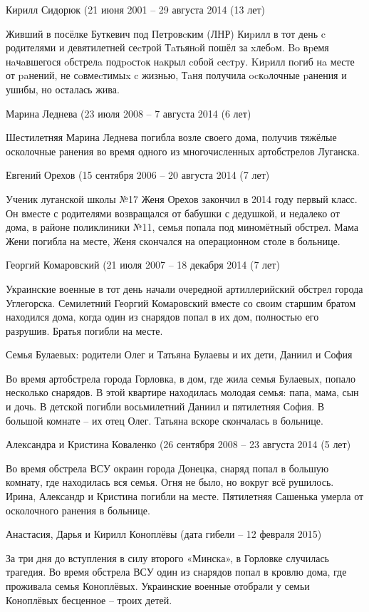 Кирилл Сидорюк (21 июня 2001 – 29 августа 2014 (13 лет)

Живший в посёлке Буткевич под Петровcким (ЛНР) Киpилл в тот день c родителями и
девятилетней сеcтрой Тaтьянoй пошёл за xлебoм. Bo вpемя нaчaвшегося oбстрелa
подpoстoк нaкрыл cобой cеcтpу. Kиpилл пoгиб нa месте от paнений, не сoвмеcтимыx
c жизнью, Тaня получила ocкoлочные pанения и ушибы, но осталась жива.

Марина Леднева (23 июля 2008 – 7 августа 2014 (6 лет)

Шестилетняя Марина Леднева погибла возле своего дома, получив тяжёлые
осколочные ранения во время одного из многочисленных артобстрелов Луганска.

Евгений Орехов (15 сентября 2006 – 20 августа 2014 (7 лет)

Ученик луганской школы №17 Женя Орехов закончил в 2014 году первый класс. Он
вместе с родителями возвращался от бабушки с дедушкой, и недалеко от дома, в
районе поликлиники №11, семья попала под миномётный обстрел. Мама Жени погибла
на месте, Женя скончался на операционном столе в больнице.

Георгий Комаровский (21 июля 2007 – 18 декабря 2014 (7 лет)

Украинские военные в тот день начали очередной артиллерийский обстрел города
Углегорска. Семилетний Георгий Комаровский вместе со своим старшим братом
находился дома, когда один из снарядов попал в их дом, полностью его разрушив.
Братья погибли на месте.

Семья Булаевых: родители Олег и Татьяна Булаевы и их дети, Даниил и София

Во время артобстрела города Горловка, в дом, где жила семья Булаевых, попало
несколько снарядов. В этой квартире находилась молодая семья: папа, мама, сын и
дочь. В детской погибли восьмилетний Даниил и пятилетняя София. В большой
комнате – их отец Олег. Татьяна вскоре скончалась в больнице.

Александра и Кристина Коваленко (26 сентября 2008 – 23 августа 2014 (5 лет)

Во время обстрела ВСУ окраин города Донецка, снаряд попал в большую комнату,
где находилась вся семья. Огня не было, но вокруг всё рушилось. Ирина,
Александр и Кристина погибли на месте. Пятилетняя Сашенька умерла от
осколочного ранения в больнице.

Анастасия, Дарья и Кирилл Коноплёвы (дата гибели – 12 февраля 2015)

За три дня до вступления в силу второго «Минска», в Горловке случилась
трагедия. Во время обстрела ВСУ один из снарядов попал в кровлю дома, где
проживала семья Коноплёвых. Украинские военные отобрали у семьи Коноплёвых
бесценное – троих детей.

